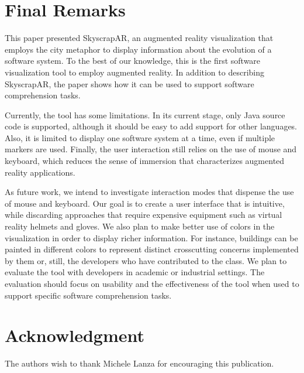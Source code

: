 \section{Final Remarks} \label{sec:finalRemarks}
This paper presented SkyscrapAR, an augmented reality visualization that employs the city metaphor to display information about the evolution of a software system. To the best of our knowledge, this is the first software visualization tool to employ augmented reality. In addition to describing SkyscrapAR, the paper shows how it can be used to support software comprehension tasks.

Currently, the tool has some limitations. In its current stage, only Java source code is supported, although it should be easy to add support for other languages. Also, it is limited to display one software system at a time, even if multiple markers are used. Finally, the user interaction still relies on the use of mouse and keyboard, which reduces the sense of immersion that characterizes augmented reality applications.

As future work, we intend to investigate interaction modes that dispense the use of mouse and keyboard. Our goal is to create a user interface that is intuitive, while discarding approaches that require expensive equipment such as virtual reality helmets and gloves. We also plan to make better use of colors in the visualization in order to display richer information. For instance, buildings can be painted in different colors to represent distinct crosscutting concerns implemented by them or, still, the developers who have contributed to the class. We plan to evaluate the tool with developers in academic or industrial settings. The evaluation should focus on usability and the effectiveness of the tool when used to support specific software comprehension tasks.

\section*{Acknowledgment}
The authors wish to thank Michele Lanza for encouraging this publication.
